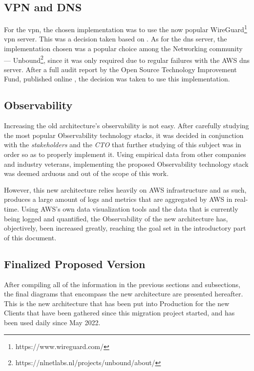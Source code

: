 \subsection{VPN and DNS}\label{methodology:ss:vpn-and-dns}

For the \gls{vpn}, the chosen implementation was to use the now popular WireGuard\footnote{https://www.wireguard.com/\label{foot:wireguard}} \gls{vpn} server. This was a decision taken based on \parencite{ndss_wireguard}.
As for the \gls{dns} server, the implementation chosen was a popular choice among the Networking community --- Unbound\footnote{https://nlnetlabs.nl/projects/unbound/about/}, since it was only required due to regular failures with the AWS \gls{dns} server. After a full audit report by the Open Source Technology Improvement Fund, published online \parencite{ostif_2022}, the decision was taken to use this implementation.

\subsection{Observability}\label{methodology:ss:final-observability}

Increasing the old architecture's observability is not easy. After carefully studying the most popular Observability technology stacks, it was decided in conjunction with the \textit{stakeholders} and the \textit{CTO} that further studying of this subject was in order so as to properly implement it. Using empirical data from other companies and industry veterans, implementing the proposed Observability technology stack was deemed arduous and out of the scope of this work.

However, this new architecture relies heavily on AWS infrastructure and as such, produces a large amount of logs and metrics that are aggregated by AWS in real-time. Using AWS's own data visualization tools and the data that is currently being logged and quantified, the Observability of the new architecture has, objectively, been increased greatly, reaching the goal set in the introductory part of this document.

\subsection{Finalized Proposed Version}\label{methodology:ss:finalized-proposed-version}

After compiling all of the information in the previous sections and subsections, the final diagrams that encompass the new architecture are presented hereafter. This is the new architecture that has been put into Production for the new Clients that have been gathered since this migration project started, and has been used daily since May 2022. 

